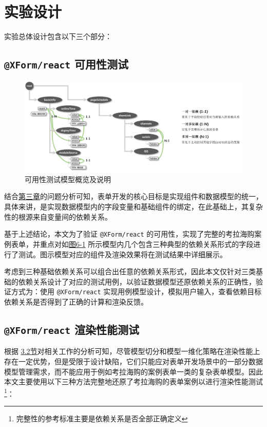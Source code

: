 \documentclass[winfonts,master,twoside]{njuthesis}
\makeatletter
\newcommand{\xform}[1]{\texttt{@XForm/#1}}
\makeatother
\begin{document}
\section{实验设计}

实验总体设计包含以下三个部分：

\subsection{\xform{react} 可用性测试}

\begin{figure}[h]
    \centering
    \includegraphics[width=\textwidth]{figure/chapter-5/usability-test-model.png}
    \caption{可用性测试模型概览及说明}
    \label{usability-test-model}
\end{figure}

结合\hyperref[problem-analysis]{第三章}的问题分析可知，表单开发的核心目标是实现组件和数据模型的统一，具体来讲，是实现数据模型内的字段变量和基础组件的绑定，在此基础上，其复杂性的根源来自变量间的依赖关系。

基于上述结论，本文为了验证 \xform{react} 的可用性，实现了完整的考拉海购案例表单，并重点对如\hyperref[usability-test-model]{图6-1} 所示模型内几个包含三种典型的依赖关系形式的字段进行了测试。图示模型对应的组件及渲染效果将在测试结果中详细展示。

考虑到三种基础依赖关系可以组合出任意的依赖关系形式，因此本文仅针对三类基础的依赖关系设计了对应的测试用例，以验证数据模型还原依赖关系的正确性，验证方式为：使用 \xform{react} 实现用例模型设计，模拟用户输入，查看依赖目标依赖关系是否得到了正确的计算和渲染反馈。

\subsection{\xform{react} 渲染性能测试}

根据 \hyperref[related-work-analysis]{3.2节}对相关工作的分析可知，尽管模型切分和模型一维化策略在渲染性能上存在一定优势，但是受限于设计缺陷，它们只能应对表单开发场景中的一部分数据模型管理需求，而不能应用于例如考拉海购的案例表单一类的复杂表单模型。因此本文主要使用以下三种方法完整地还原了考拉海购的表单案例以进行渲染性能测试\footnote{完整性的参考标准主要是依赖关系是否全部正确定义}：
\end{document}
